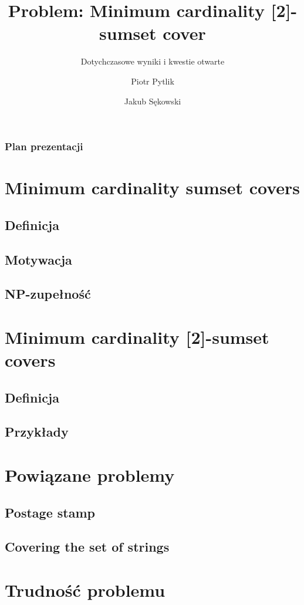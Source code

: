 \documentclass{beamer}
\begin{document}
\title{Problem: Minimum cardinality [2]-sumset cover}
\subtitle{Dotychczasowe wyniki i kwestie otwarte}
\author[Piotr Pytlik \& Jakub Sękowski]{Piotr Pytlik \and Jakub Sękowski}

\begin{frame}
	\titlepage
\end{frame}

\begin{frame}
	\frametitle{Plan prezentacji}
	\tableofcontents
\end{frame}

\section{Minimum cardinality sumset covers}
	\subsection{Definicja}
	\subsection{Motywacja}
	\subsection{NP-zupełność}
\section{Minimum cardinality [2]-sumset covers}
	\subsection{Definicja}
	\subsection{Przykłady}
\section{Powiązane problemy}
	\subsection{Postage stamp}
	\subsection{Covering the set of strings}
\section{Trudność problemu}
\end{document}
